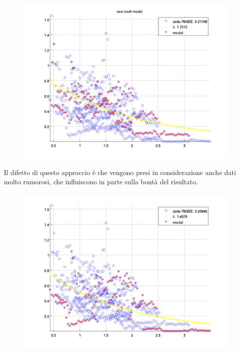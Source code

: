 \documentclass[12pt]{report}
\begin{document}
\begin{figure}[H]
	\centering
	\includegraphics[scale=0.6]{images/ransac1}
	\label{fig:tryLam}
\end{figure}

\noindent Il difetto di questo approccio \`e che vengono presi in considerazione anche dati molto rumorosi, che influiscono in parte sulla bont\`a del risultato.

\begin{figure}[H]
	\centering
	\includegraphics[scale=0.6]{images/ransacWin}
	\label{fig:ransac}
\end{figure}
\end{document}
